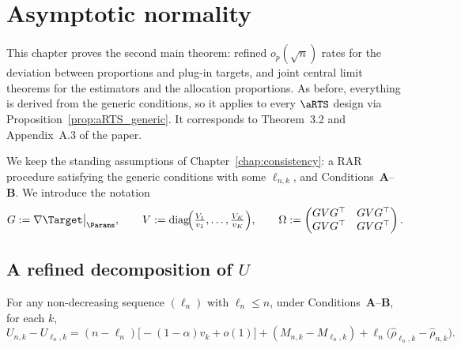 \chapter{Asymptotic normality}
\label{chap:normality}

This chapter proves the second main theorem: refined $o_p(\sqrt n)$ rates for the
deviation between proportions and plug-in targets, and joint central limit
theorems for the estimators and the allocation proportions. As before, everything
is derived from the generic conditions, so it applies to every $\aRTS$ design via
Proposition~\ref{prop:aRTS_generic}. It corresponds to Theorem~3.2 and
Appendix~A.3 of the paper.

We keep the standing assumptions of Chapter~\ref{chap:consistency}: a RAR
procedure satisfying the generic conditions with some $\ell_{n,k}$, and
Conditions~\textbf{A}--\textbf{B}. We introduce the notation
\[
  G := \nabla\Target\big|_\Params, \qquad
  V := \mathrm{diag}\!\Big(\tfrac{V_1}{v_1}, \dots, \tfrac{V_K}{v_K}\Big), \qquad
  \Omega := \begin{pmatrix} GVG^\top & GVG^\top\\ GVG^\top & GVG^\top\end{pmatrix}.
\]

\section{A refined decomposition of \texorpdfstring{$U$}{U}}
\label{sec:norm_U}

\begin{lemma}\label{lem:diff_U_decomp}
\leanok
{}
For any non-decreasing sequence $(\ell_n)$ with $\ell_n\le n$, under
Conditions~\textbf{A}--\textbf{B}, for each $k$,
\[
  U_{n,k} - U_{\ell_n,k}
  = (n-\ell_n)\big[-(1-\alpha)v_k + o(1)\big]
    + (M_{n,k} - M_{\ell_n,k})
    + \ell_n\big(\hat{\rho}_{\ell_n,k} - \hat{\rho}_{n,k}\big).
\]
\end{lemma}

